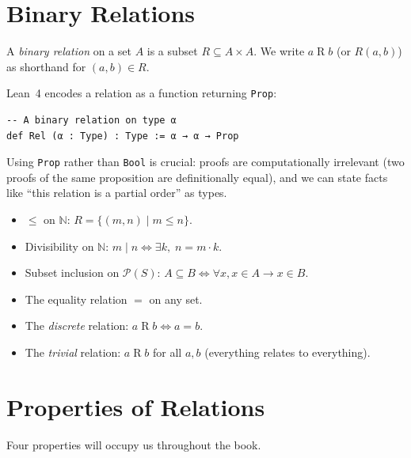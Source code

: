 \documentclass[12pt, a4paper, openright]{book}
\theoremstyle{thmstyle}
\theoremstyle{defstyle}
\newcommand{\lc}[1]{\texttt{#1}}
\newenvironment{defbox}[1][]{%
  \begin{tcolorbox}[defbox, title={Definition\ifx\\#1\\\else\ --- #1\fi}]%
}{\end{tcolorbox}}
\newenvironment{exbox}[1][]{%
  \begin{tcolorbox}[exbox, title={Example\ifx\\#1\\\else\ --- #1\fi}]%
}{\end{tcolorbox}}
\begin{document}
\section{Binary Relations}

\begin{defbox}[Binary Relation]
  A \emph{binary relation} on a set $A$ is a subset $R \subseteq A \times A$.
  We write $a \mathrel{R} b$ (or $R(a, b)$) as shorthand for $(a, b) \in R$.
\end{defbox}

Lean~4 encodes a relation as a function returning \lc{Prop}:

\begin{verbatim}
-- A binary relation on type α
def Rel (α : Type) : Type := α → α → Prop
\end{verbatim}

Using \lc{Prop} rather than \lc{Bool} is crucial: proofs are computationally
irrelevant (two proofs of the same proposition are definitionally equal), and
we can state facts like ``this relation is a partial order'' as types.

\begin{exbox}[Common relations]
  \begin{itemize}[nosep]
    \item $\leq$ on $\mathbb{N}$: $R = \{(m, n) \mid m \leq n\}$.
    \item Divisibility on $\mathbb{N}$: $m \mid n \iff \exists k,\; n = m \cdot k$.
    \item Subset inclusion on $\mathcal{P}(S)$: $A \subseteq B \iff \forall x, x \in A \to x \in B$.
    \item The equality relation $=$ on any set.
    \item The \emph{discrete} relation: $a \mathrel{R} b \iff a = b$.
    \item The \emph{trivial} relation: $a \mathrel{R} b$ for all $a, b$ (everything relates to everything).
  \end{itemize}
\end{exbox}

\section{Properties of Relations}

Four properties will occupy us throughout the book.
\end{document}
